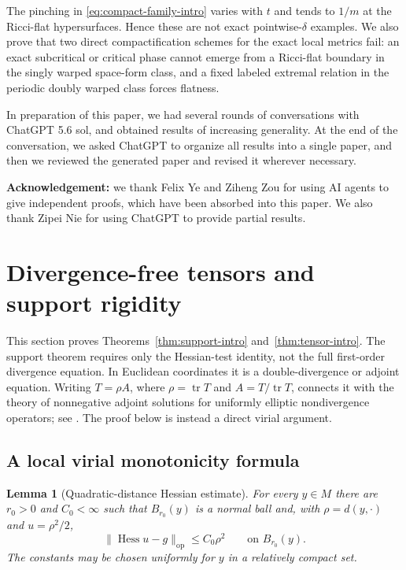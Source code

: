 \documentclass[11pt,reqno]{amsart}
\newtheorem{lemma}[theorem]{Lemma}
\theoremstyle{definition}
\theoremstyle{remark}
\newcommand{\tr}{\operatorname{tr}}
\newcommand{\Hess}{\operatorname{Hess}}
\newcommand{\norm}[1]{\lVert #1\rVert}
\begin{document}
The pinching in \eqref{eq:compact-family-intro} varies with $t$ and tends to $1/m$ at the Ricci-flat hypersurfaces.  Hence these are not exact pointwise-$\delta$ examples.  We also prove that two direct compactification schemes for the exact local metrics fail: an exact subcritical or critical phase cannot emerge from a Ricci-flat boundary in the singly warped space-form class, and a fixed labeled extremal relation in the periodic doubly warped class forces flatness.

In preparation of this paper, we had several rounds of conversations with ChatGPT 5.6 sol, and obtained results of increasing generality. At the end of the conversation, we asked ChatGPT to organize all results into a single paper, and then we reviewed the generated paper and revised it wherever necessary.

\textbf{Acknowledgement:} we thank Felix Ye and Ziheng Zou for using AI agents to give independent proofs, which have been absorbed into this paper. We also thank Zipei Nie for using ChatGPT to provide partial results.

\section{Divergence-free tensors and support rigidity}\label{sec:tensors}

This section proves Theorems~\ref{thm:support-intro} and~\ref{thm:tensor-intro}.  The support theorem requires only the Hessian-test identity, not the full first-order divergence equation.  In Euclidean coordinates it is a double-divergence or adjoint equation.  Writing $T=\rho A$, where $\rho=\tr T$ and $A=T/\tr T$, connects it with the theory of nonnegative adjoint solutions for uniformly elliptic nondivergence operators; see \cite{Bauman,FabesStroock,DongEscauriazaKim}.  The proof below is instead a direct virial argument.

\subsection{A local virial monotonicity formula}

\begin{lemma}[Quadratic-distance Hessian estimate]\label{lem:hess-distance}
For every $y\in M$ there are $r_0>0$ and $C_0<\infty$ such that $B_{r_0}(y)$ is a normal ball and, with $\rho=d(y,\cdot)$ and $u=\rho^2/2$,
\begin{equation}\label{eq:hess-error}
\norm{\Hess u-g}_{\mathrm{op}}\le C_0\rho^2
\qquad\text{on }B_{r_0}(y).
\end{equation}
The constants may be chosen uniformly for $y$ in a relatively compact set.
\end{lemma}
\end{document}
